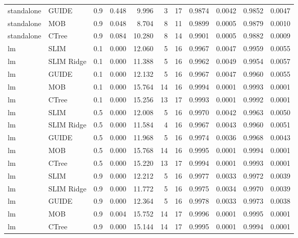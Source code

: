 \begin{table}[!htb]
\begin{tabular}[t]{l|l|r|r|r|r|r|r|r|r|r}
standalone & GUIDE & 0.9 & 0.448 & 9.996 & 3 & 17 & 0.9874 & 0.0042 & 0.9852 & 0.0047\\
standalone & MOB & 0.9 & 0.048 & 8.704 & 8 & 11 & 0.9899 & 0.0005 & 0.9879 & 0.0010\\
standalone & CTree & 0.9 & 0.084 & 10.280 & 8 & 14 & 0.9901 & 0.0005 & 0.9882 & 0.0009\\
\hline
lm & SLIM & 0.1 & 0.000 & 12.060 & 5 & 16 & 0.9967 & 0.0047 & 0.9959 & 0.0055\\
lm & SLIM Ridge & 0.1 & 0.000 & 11.388 & 5 & 16 & 0.9962 & 0.0049 & 0.9954 & 0.0057\\
lm & GUIDE & 0.1 & 0.000 & 12.132 & 5 & 16 & 0.9967 & 0.0047 & 0.9960 & 0.0055\\
lm & MOB & 0.1 & 0.000 & 15.764 & 14 & 16 & 0.9994 & 0.0001 & 0.9993 & 0.0001\\
lm & CTree & 0.1 & 0.000 & 15.256 & 13 & 17 & 0.9993 & 0.0001 & 0.9992 & 0.0001\\
\hline
lm & SLIM & 0.5 & 0.000 & 12.008 & 5 & 16 & 0.9970 & 0.0042 & 0.9963 & 0.0050\\
lm & SLIM Ridge & 0.5 & 0.000 & 11.584 & 4 & 16 & 0.9967 & 0.0043 & 0.9960 & 0.0051\\
lm & GUIDE & 0.5 & 0.000 & 11.968 & 5 & 16 & 0.9974 & 0.0036 & 0.9968 & 0.0043\\
lm & MOB & 0.5 & 0.000 & 15.768 & 14 & 16 & 0.9995 & 0.0001 & 0.9994 & 0.0001\\
lm & CTree & 0.5 & 0.000 & 15.220 & 13 & 17 & 0.9994 & 0.0001 & 0.9993 & 0.0001\\
\hline
lm & SLIM & 0.9 & 0.000 & 12.212 & 5 & 16 & 0.9977 & 0.0033 & 0.9972 & 0.0039\\
lm & SLIM Ridge & 0.9 & 0.000 & 11.772 & 5 & 16 & 0.9975 & 0.0034 & 0.9970 & 0.0039\\
lm & GUIDE & 0.9 & 0.000 & 12.364 & 5 & 16 & 0.9978 & 0.0033 & 0.9973 & 0.0038\\
lm & MOB & 0.9 & 0.004 & 15.752 & 14 & 17 & 0.9996 & 0.0001 & 0.9995 & 0.0001\\
lm & CTree & 0.9 & 0.000 & 15.144 & 14 & 17 & 0.9995 & 0.0001 & 0.9994 & 0.0001\\
\hline
\end{tabular}
\label{tab:linear_smooth_correlated_summary}
\end{table} 


